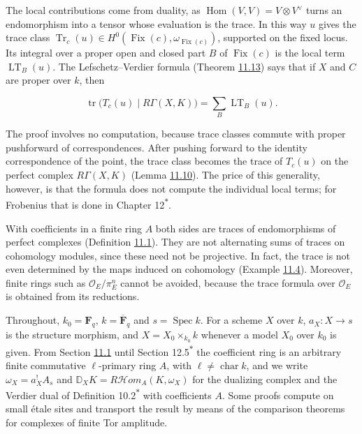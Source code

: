 \documentclass[11pt]{article}
\newcommand{\bpout}[1]{#1\textsuperscript{\hyperlink{bp-outside}{\ensuremath{\ast}}}}
\providecommand{\Fix}{}\renewcommand{\Fix}{\operatorname{Fix}}
\providecommand{\cHom}{}\renewcommand{\cHom}{R\mathcal{H}\!om}
\begin{document}
The local contributions come from duality, as \(\operatorname{Hom}(V,V)=V\otimes
V^\vee\) turns an endomorphism into a tensor whose evaluation is the trace. In this way \(u\) gives the trace class \(\operatorname{Tr}_c(u)\in H^0(\Fix(c),\omega_{\Fix(c)})\), supported on the fixed locus. Its integral over a proper open and closed part \(B\) of \(\Fix(c)\) is the local term \(\operatorname{LT}_B(u)\). The Lefschetz–Verdier formula (Theorem \hyperref[bp37]{11.13}) says that if \(X\) and \(C\) are proper over \(k\), then

\[
\operatorname{tr}\bigl(T_c(u)\mid R\Gamma(X,K)\bigr)
=\sum_B\operatorname{LT}_B(u).
\]

The proof involves no computation, because trace classes commute with proper pushforward of correspondences. After pushing forward to the identity correspondence of the point, the trace class becomes the trace of \(T_c(u)\) on the perfect complex \(R\Gamma(X,K)\) (Lemma \hyperref[bp30]{11.10}). The price of this generality, however, is that the formula does not compute the individual local terms; for Frobenius that is done in Chapter \bpout{12}.

With coefficients in a finite ring \(A\) both sides are traces of endomorphisms of perfect complexes (Definition \hyperref[bp5]{11.1}). They are not alternating sums of traces on cohomology modules, since these need not be projective. In fact, the trace is not even determined by the maps induced on cohomology (Example \hyperref[bp12]{11.4}). Moreover, finite rings such as \(\mathcal O_E/\pi_E^n\) cannot be avoided, because the trace formula over \(\mathcal O_E\) is obtained from its reductions.

Throughout, \(k_0=\mathbf F_q\), \(k=\overline{\mathbf F}_q\) and \(s=\operatorname{Spec}k\). For a scheme \(X\) over \(k\), \(a_X:X\to s\) is the structure morphism, and \(X=X_0\times_{k_0}k\) whenever a model \(X_0\) over \(k_0\) is given. From Section \hyperref[bp3]{11.1} until Section \bpout{12.5} the coefficient ring is an arbitrary finite commutative \(\ell\)-primary ring \(A\), with \(\ell\ne\operatorname{char}k\), and we write \(\omega_X=a_X^!A_s\) and \(\mathbb D_XK=\cHom_A(K,\omega_X)\) for the dualizing complex and the Verdier dual of Definition \bpout{10.2} with coefficients \(A\). Some proofs compute on small étale sites and transport the result by means of the comparison theorems for complexes of finite Tor amplitude.

\end{document}
